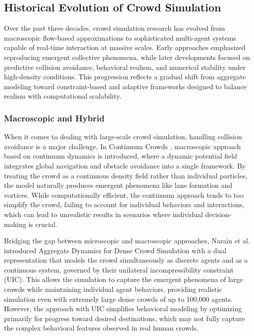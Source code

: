 \subsection{Historical Evolution of Crowd Simulation}

Over the past three decades, crowd simulation research has evolved from macroscopic flow-based approximations to sophisticated multi-agent systems capable of real-time interaction at massive scales. Early approaches emphasized reproducing emergent collective phenomena, while later developments focused on predictive collision avoidance, behavioral realism, and numerical stability under high-density conditions. This progression reflects a gradual shift from aggregate modeling toward constraint-based and adaptive frameworks designed to balance realism with computational scalability.

\subsubsection{Macroscopic and Hybrid}
When it comes to dealing with large-scale crowd simulation, handling collision avoidance is a major challenge. In Continuum Crowds \cite{treuille2006continuum}, macroscopic approach based on continuum dynamics is introduced, where a dynamic potential field integrates global navigation and obstacle avoidance into a single framework. By treating the crowd as a continuous density field rather than individual particles, the model naturally produces emergent phenomena like lane formation and vortices. While computationally efficient, the continuum approach tends to too simplify the crowd, failing to account for individual behaviors and interactions, which can lead to unrealistic results in scenarios where individual decision-making is crucial.

Bridging the gap between microscopic and macroscopic approaches, Narain et al. \cite{narain2009aggregate} introduced Aggregate Dynamics for Dense Crowd Simulation with a dual representation that models the crowd simultaneously as discrete agents and as a continuous system, governed by their unilateral incompressibility constraint (UIC). This allows the simulation to capture the emergent phenomena of large crowds while maintaining individual agent behaviors, providing realistic simulation even with extremely large dense crowds of up to 100,000 agents. However, the approach with UIC simplifies behavioral modeling by optimizing primarily for progress toward desired destinations, which may not fully capture the complex behavioral features observed in real human crowds.

